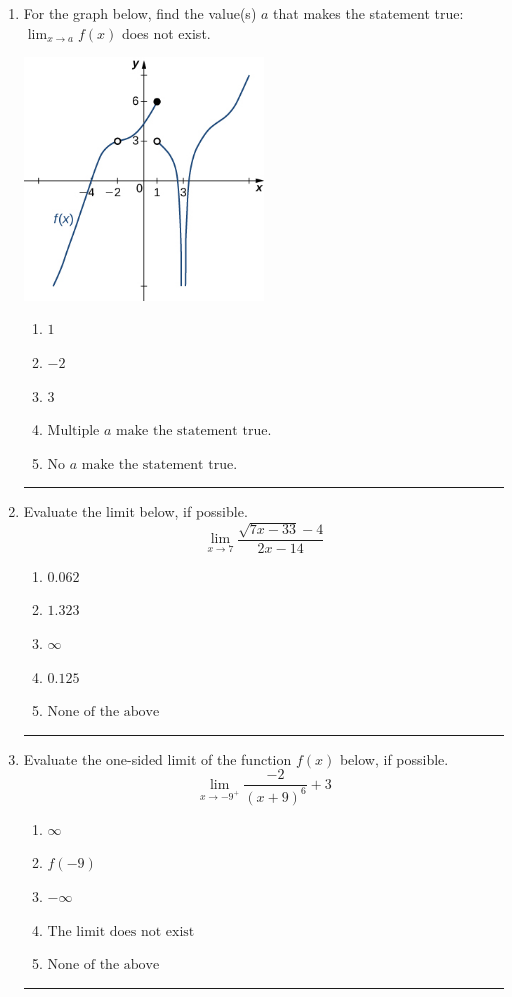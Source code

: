 \documentclass[14pt]{extbook}
\newcommand{\litem}[1]{\item#1\hspace*{-1cm}\rule{\textwidth}{0.4pt}}
\begin{document}
\begin{enumerate}
\litem{
For the graph below, find the value(s) $a$ that makes the statement true: $ \displaystyle \lim_{x \rightarrow a} f(x)$ does not exist.
\begin{center}
    \includegraphics[width=0.5\textwidth]{../Figures/evaluateLimitGraphicallyB.png}
\end{center}
\begin{enumerate}[label=\Alph*.]
\item \( 1 \)
\item \( -2 \)
\item \( 3 \)
\item \( \text{Multiple } a \text{ make the statement true}. \)
\item \( \text{No } a \text{ make the statement true}. \)

\end{enumerate} }
\litem{
Evaluate the limit below, if possible.\[ \lim_{x \rightarrow 7} \frac{\sqrt{7x - 33} - 4}{2x - 14} \]\begin{enumerate}[label=\Alph*.]
\item \( 0.062 \)
\item \( 1.323 \)
\item \( \infty \)
\item \( 0.125 \)
\item \( \text{None of the above} \)

\end{enumerate} }
\litem{
Evaluate the one-sided limit of the function $f(x)$ below, if possible.\[ \lim_{x \rightarrow -9^+} \frac{-2}{(x+9)^6}+3 \]\begin{enumerate}[label=\Alph*.]
\item \( \infty \)
\item \( f(-9) \)
\item \( -\infty \)
\item \( \text{The limit does not exist} \)
\item \( \text{None of the above} \)


\end{enumerate}}
\end{enumerate}
\end{document}

